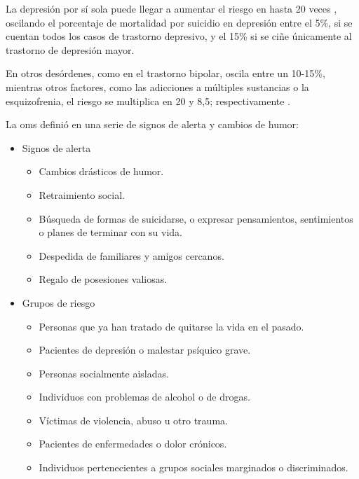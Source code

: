        La depresión por sí sola puede llegar a aumentar el riesgo en hasta 20 veces \cite{gonzalez_depresion_2020}, oscilando el porcentaje de mortalidad por suicidio en depresión entre el 5\%, si se cuentan todos los casos de trastorno depresivo, y el 15\% si se ciñe únicamente al trastorno de depresión mayor. 
        
        En otros desórdenes, como en el trastorno bipolar, oscila entre un 10-15\%, mientras otros factores, como las adicciones a múltiples sustancias o la esquizofrenia, el riesgo se multiplica en 20 y 8,5; respectivamente \cite{gonzalez_depresion_2020}. 

        La \gls{oms} definió en \cite{oms_suicidio_2023} una serie de signos de alerta y cambios de humor:
        \begin{itemize}
            \item Signos de alerta
                \begin{itemize}
                    \item Cambios drásticos de humor.
                    \item Retraimiento social.
                    \item Búsqueda de formas de suicidarse, o expresar pensamientos, sentimientos o planes de terminar con su vida.
                    \item Despedida de familiares y amigos cercanos.
                    \item Regalo de posesiones valiosas.
                \end{itemize}
            \item Grupos de riesgo
                \begin{itemize}
                    \item Personas que ya han tratado de quitarse la vida en el pasado.
                    \item Pacientes de depresión o malestar psíquico grave.
                    \item Personas socialmente aisladas.
                    \item Individuos con problemas de alcohol o de drogas.
                    \item Víctimas de violencia, abuso u otro trauma.
                    \item Pacientes de enfermedades o dolor crónicos.
                    \item Individuos pertenecientes a grupos sociales marginados o discriminados.
                \end{itemize}
        \end{itemize}
       
